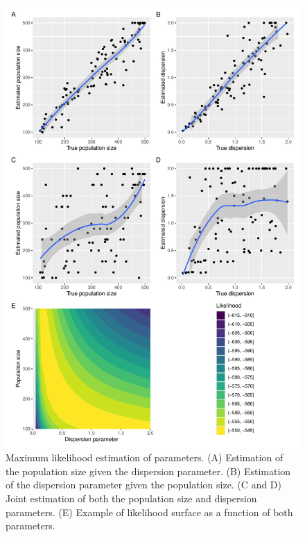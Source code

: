 \documentclass{article}
\begin{document}
\begin{figure}[!p]
\begin{center}
\includegraphics[width=14cm]{../run/figureEstim.pdf}
\end{center}
\caption{Maximum likelihood estimation of parameters. (A) Estimation of the population
size given the dispersion parameter. (B) Estimation of the dispersion parameter
given the population size. (C and D) Joint estimation of both the population
size and dispersion parameters. (E) Example of likelihood surface as a function
of both parameters.
\label{fig:estim}}
\end{figure}
\end{document}
